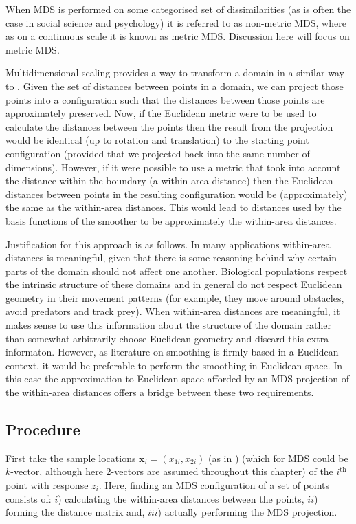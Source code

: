 When MDS is performed on some categorised set of dissimilarities (as is often the case in social science and psychology) it is referred to as non-metric MDS, where as on a continuous scale it is known as metric MDS. Discussion here will focus on metric MDS.

Multidimensional scaling provides a way to transform a domain in a similar way to \sch. Given the set of distances between points in a domain, we can project those points into a configuration such that the distances between those points are approximately preserved. Now, if the Euclidean metric were to be used to calculate the distances between the points then the result from the projection would be identical (up to rotation and translation) to the starting point configuration (provided that we projected back into the same number of dimensions). However, if it were possible to use a metric that took into account the distance within the boundary (a within-area distance) then the Euclidean distances between points in the resulting configuration would be (approximately) the same as the within-area distances. This would lead to distances used by the basis functions of the smoother to be approximately the within-area distances.

Justification for this approach is as follows. In many applications within-area distances is meaningful, given that there is some reasoning behind why certain parts of the domain should not affect one another. Biological populations respect the intrinsic structure of these domains and in general do not respect Euclidean geometry in their movement patterns (for example, they move around obstacles, avoid predators and track prey). When within-area distances are meaningful, it makes sense to use this information about the structure of the domain rather than somewhat arbitrarily choose Euclidean geometry and discard this extra informaton. However, as literature on smoothing is firmly based in a Euclidean context, it would be preferable to perform the smoothing in Euclidean space. In this case the approximation to Euclidean space afforded by an MDS projection of the within-area distances offers a bridge between these two requirements.

\subsection{Procedure}
\label{mdsproc}
First take the sample locations $\mathbf{x}_i = (x_{1i}, x_{2i})$ (as in ) (which for MDS could be $k$-vector, although here 2-vectors are assumed throughout this chapter) of the $i^\text{th}$ point with response $z_i$. Here, finding an MDS configuration of a set of points consists of: $i$) calculating the within-area distances between the points, $ii$) forming the distance matrix and, $iii$) actually performing the MDS projection.

